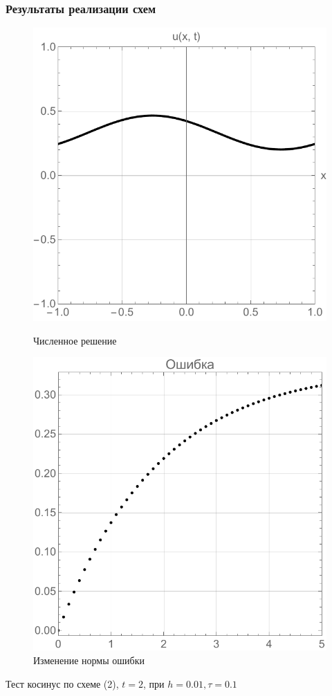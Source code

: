 \documentclass{beamer}
\begin{document}
\begin{frame}
	\frametitle{Результаты реализации схем}
	\begin{figure}
		\centering
		\begin{minipage}{0.45\textwidth}
			\centering
			\includegraphics[width=\textwidth]{res1_2}
			\caption{Численное решение}
			\label{fig:first}
		\end{minipage}\hfill
		\begin{minipage}{0.45\textwidth}
			\centering
			\includegraphics[width=\textwidth]{res1_3}
			\caption{Изменение нормы ошибки}
			\label{fig:second}
		\end{minipage}
	\end{figure}
	\centering Тест косинус по схеме (2), $ t = 2$, при $h = 0.01, \tau = 0.1$
\end{frame}
\end{document}
